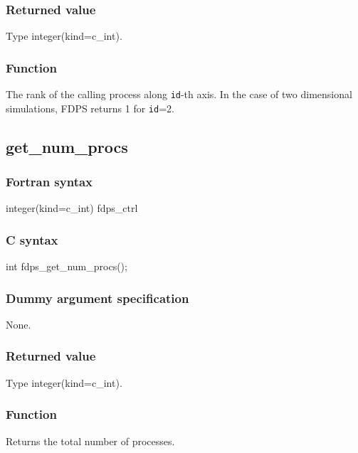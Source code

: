 \subsubsection*{Returned value}
Type integer(kind=c\_int). 

\subsubsection*{Function}
The rank of the calling process along {\tt id}-th axis. In the case of two dimensional simulations, FDPS returns 1 for {\tt id}=2.
\clearpage

\subsection{get\_num\_procs}
\subsubsection*{Fortran syntax}
\begin{screen}
\begin{spverbatim}
integer(kind=c_int) fdps_ctrl%
\end{spverbatim}
\end{screen}

\subsubsection*{C syntax}
\begin{screen}
\begin{spverbatim}
int fdps_get_num_procs();
\end{spverbatim}
\end{screen}

\subsubsection*{Dummy argument specification}
None.

\subsubsection*{Returned value}
Type integer(kind=c\_int).

\subsubsection*{Function}
Returns the total number of processes.
\clearpage

